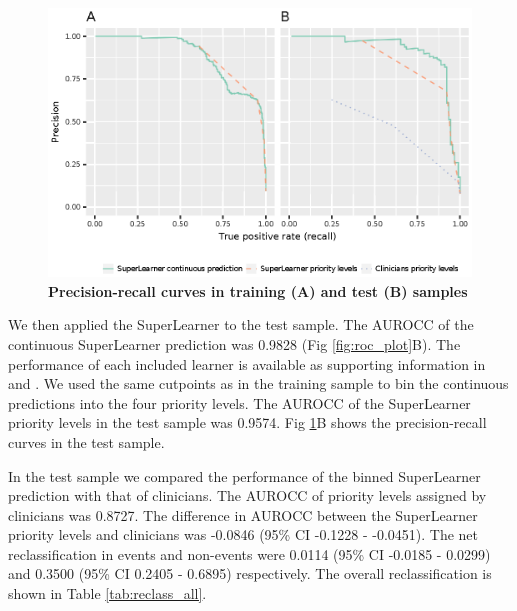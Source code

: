 \documentclass[10pt,letterpaper]{article}\usepackage[]{graphicx}\usepackage[]{color}
\begin{document}
\begin{figure}[!h]
  \includegraphics{prec_rec_plot.eps}
  \caption{\bf Precision-recall curves in training (A) and test (B) samples}
  \label{fig:prec_rec_plot}
\end{figure}

We then applied the SuperLearner to the test sample. The AUROCC of the
continuous SuperLearner prediction was 0.9828 (Fig
\ref{fig:roc_plot}B). The performance of each included learner is available as
supporting information in  and . We used the
same cutpoints as in the training sample to bin the continuous predictions into
the four priority levels. The AUROCC of the SuperLearner priority levels in the
test sample was 0.9574. Fig
\ref{fig:prec_rec_plot}B shows the precision-recall curves in the test sample.

In the test sample we compared the performance of the binned SuperLearner
prediction with that of clinicians. The AUROCC of priority levels assigned by
clinicians was 0.8727. The difference in AUROCC between the
SuperLearner priority levels and clinicians was
-0.0846 (95\% CI -0.1228 - -0.0451). The net reclassification in events and
non-events were 0.0114 (95\% CI -0.0185 - 0.0299) and 0.3500 (95\% CI 0.2405 - 0.6895) respectively. The overall
reclassification is shown in Table \ref{tab:reclass_all}.
\end{document}
